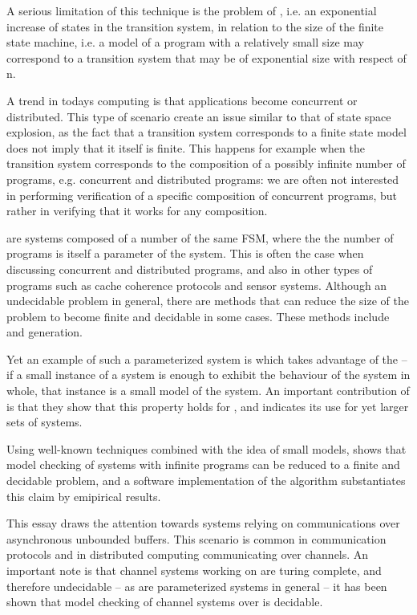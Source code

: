 A serious limitation of this technique is the problem of , i.e. an exponential increase of states in the transition system, in relation to the size of the finite state machine, i.e. a model of a program with a relatively small size may correspond to a transition system that may be of exponential size with respect of n.

A trend in todays computing is that applications become concurrent or distributed. This type of scenario create an issue similar to that of state space explosion, as the fact that a transition system corresponds to a finite state model does not imply that it itself is finite. This happens for example when the transition system corresponds to the composition of a possibly infinite number of programs, e.g. concurrent and distributed programs: we are often not interested in performing verification of a specific composition of concurrent programs, but rather in verifying that it works for any composition.

 are systems composed of a number of the same FSM, where the the number of programs is itself a parameter of the system. This is often the case when discussing concurrent and distributed programs, and also in other types of programs such as cache coherence protocols and sensor systems\cite{zuck2004}. Although an undecidable problem in general, there are methods that can reduce the size of the problem to become finite and decidable in some cases. These methods include \cite{counterabstraction} and  generation\cite{invinv}. 

Yet an example of such a parameterized system is \cite{parosh} which takes advantage of the  -- if a small instance of a system is enough to exhibit the behaviour of the system in whole, that instance is a small model of the system. An important contribution of \cite{parosh} is that they show that this property holds for , and indicates its use for yet larger sets of systems. 

Using well-known  techniques combined with the idea of small models, \cite{parosh} shows that model checking of systems with infinite programs can be reduced to a finite and decidable problem, and a software implementation of the algorithm substantiates this claim by emipirical results.

This essay draws the attention towards systems relying on communications over asynchronous unbounded buffers. This scenario is common in communication protocols and in distributed computing communicating over channels. An important note is that channel systems working on  are turing complete, and therefore undecidable -- as are parameterized systems in general -- it has been shown that model checking of channel systems over  is decidable\cite{287591}\cite{gordon}.

